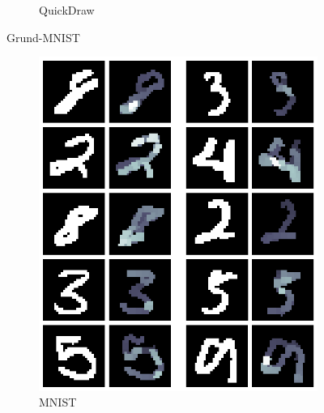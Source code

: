 \begin{figure}[!ht]
\begin{subfigure}[b]{0.3\textwidth}
        \caption{QuickDraw}
    \end{subfigure}
    \caption{Grund-MNIST}
    \label{fig:Grund-MNIST}
\end{figure}

\begin{figure}[!ht]
    \centering
    \begin{subfigure}[b]{0.3\textwidth}
        \centering
        \includegraphics[width=\textwidth]{images/resultate/base-speed-mnist.png}
        \caption{MNIST}
    \end{subfigure}
    \begin{subfigure}[b]{0.3\textwidth}
        \centering

\end{subfigure}
\end{figure}
